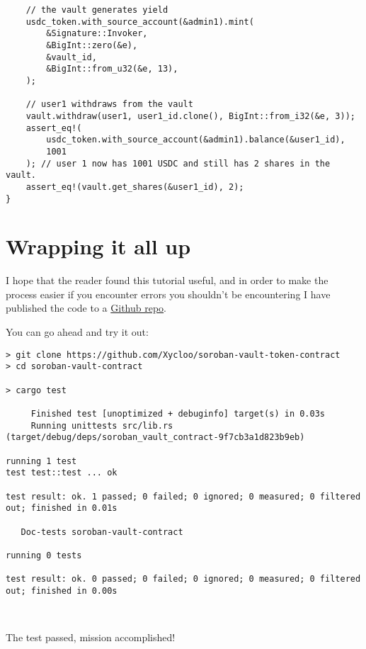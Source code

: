 \documentclass{article}
\begin{document}
\begin{lstlisting}
    // the vault generates yield
    usdc_token.with_source_account(&admin1).mint(
        &Signature::Invoker,
        &BigInt::zero(&e),
        &vault_id,
        &BigInt::from_u32(&e, 13),
    );

    // user1 withdraws from the vault
    vault.withdraw(user1, user1_id.clone(), BigInt::from_i32(&e, 3));
    assert_eq!(
        usdc_token.with_source_account(&admin1).balance(&user1_id),
        1001
    ); // user 1 now has 1001 USDC and still has 2 shares in the vault.
    assert_eq!(vault.get_shares(&user1_id), 2);
}

\end{lstlisting}

\section{Wrapping it all up}
I hope that the reader found this tutorial useful, and in order to make the process easier if you encounter errors you shouldn't be encountering I have published the code to a \href{https://github.com/Xycloo/soroban-vault-contract}{Github repo}.

You can go ahead and try it out:

\begin{lstlisting}
> git clone https://github.com/Xycloo/soroban-vault-token-contract
> cd soroban-vault-contract

> cargo test

     Finished test [unoptimized + debuginfo] target(s) in 0.03s
     Running unittests src/lib.rs (target/debug/deps/soroban_vault_contract-9f7cb3a1d823b9eb)

running 1 test
test test::test ... ok

test result: ok. 1 passed; 0 failed; 0 ignored; 0 measured; 0 filtered out; finished in 0.01s

   Doc-tests soroban-vault-contract

running 0 tests

test result: ok. 0 passed; 0 failed; 0 ignored; 0 measured; 0 filtered out; finished in 0.00s

  
\end{lstlisting}



The test passed, mission accomplished!
\end{document}
